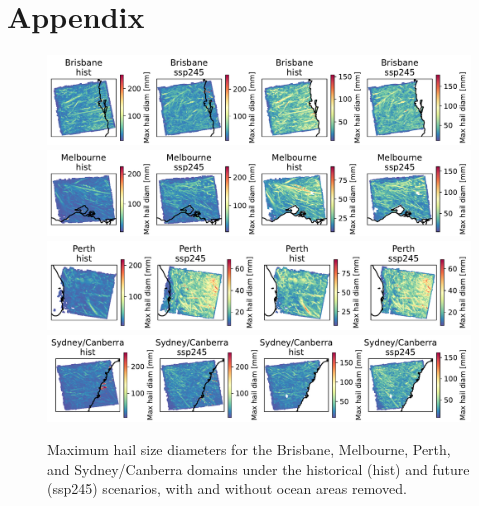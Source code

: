 \documentclass[]{agujournal2019}\usepackage[]{graphicx}\usepackage[]{xcolor}
\begin{document}
\newpage
\appendix
\setcounter{figure}{0}
\renewcommand{\thefigure}{A\arabic{figure}}

\section*{Appendix}

\begin{figure}[!ht]
      \includegraphics[width=\textwidth]{figures/maxes_Brisbane_hailcast_diam_max}
      \includegraphics[width=\textwidth]{figures/maxes_Melbourne_hailcast_diam_max}
      \includegraphics[width=\textwidth]{figures/maxes_Perth_hailcast_diam_max}
      \includegraphics[width=\textwidth]{figures/maxes_Sydney_Canberra_hailcast_diam_max}
      \caption{Maximum hail size diameters for the Brisbane, Melbourne, Perth, and Sydney/Canberra domains under the historical (hist) and future (ssp245) scenarios, with and without ocean areas removed.}
      \label{fig:maxes_Brisbane}
\end{figure}
\end{document}
